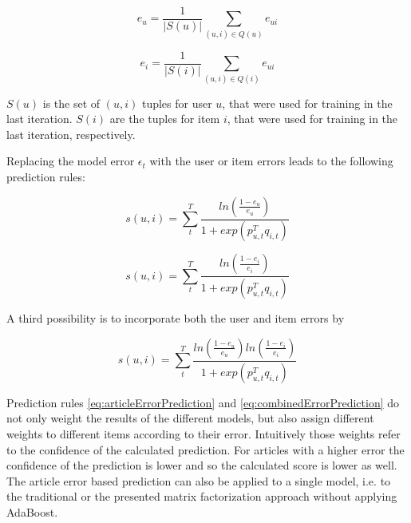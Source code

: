 \documentclass[10pt]{reportMaster}
\begin{document}
\begin{equation}
	\label{eq:userError}
	e_{u} = \frac{1}{|S(u)|} \sum_{(u,i) \in Q(u)}{e_{ui}}
\end{equation}

\begin{equation}
	\label{eq:articleError}
	e_{i} = \frac{1}{|S(i)|} \sum_{(u,i) \in Q(i)}{e_{ui}}
\end{equation}

$S(u)$ is the set of $(u,i)$ tuples for user $u$, that were used for training in the last iteration.
$S(i)$ are the tuples for item $i$, that were used for training in the last iteration, respectively.

Replacing the model error $\epsilon_t$ with the user or item errors leads to the following prediction rules:

\begin{equation}
\label{eq:userErrorPrediction}
	s(u,i) = \sum_t^T{\frac{ln(\frac{1 - e_u}{e_u})}{1 + exp(p_{u,t}^Tq_{i,t})}}
\end{equation}

\begin{equation}
\label{eq:articleErrorPrediction}
s(u,i) = \sum_t^T{\frac{ln(\frac{1 - e_i}{e_i})}{1 + exp(p_{u,t}^Tq_{i,t})}}
\end{equation}

A third possibility is to incorporate both the user and item errors by 

\begin{equation}
\label{eq:combinedErrorPrediction}
s(u,i) = \sum_t^T{\frac{ln(\frac{1 - e_u}{e_u})ln(\frac{1 - e_i}{e_i})}{1 + exp(p_{u,t}^Tq_{i,t})}}
\end{equation}

Prediction rules \ref{eq:articleErrorPrediction} and \ref{eq:combinedErrorPrediction} do not only weight the results of the different models, but also assign different weights to different items according to their error.
Intuitively those weights refer to the confidence of the calculated prediction.
For articles with a higher error the confidence of the prediction is lower and so the calculated score is lower as well.
The article error based prediction can also be applied to a single model, i.e. to the traditional or the presented matrix factorization approach without applying AdaBoost.









\end{document}
